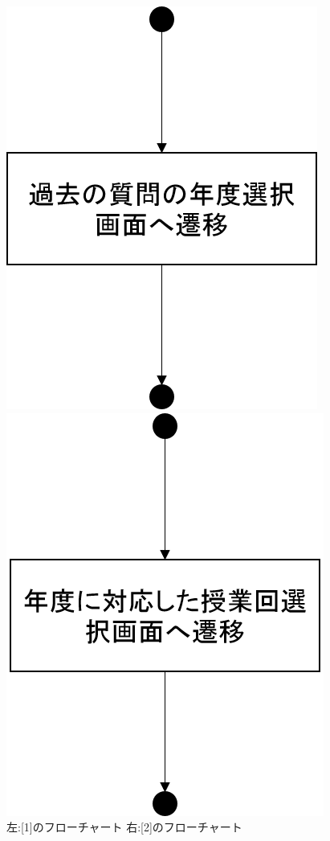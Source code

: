 \begin{figure}[htbp]
 \begin{minipage}{0.5\hsize}
  \begin{center}
   \includegraphics[width=0.45\linewidth,clip]{./img/q_read_old/sub1.png}
  \end{center}
 \end{minipage}
 \begin{minipage}{0.5\hsize}
  \begin{center}
   \includegraphics[width=0.45\linewidth,clip]{./img/q_read_old/sub2.png}
  \end{center}
 \end{minipage}
 \caption{左:[1]のフローチャート 右:[2]のフローチャート}\label{fig:qreadoldflow0}
\end{figure}

